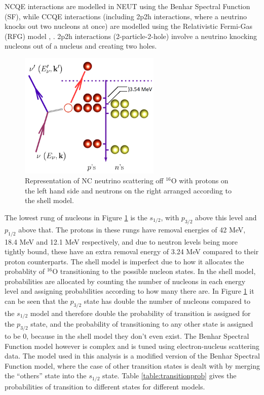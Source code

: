  NCQE interactions are modelled in NEUT using the Benhar Spectral Function (SF), while CCQE interactions (including 2p2h interactions, where a neutrino knocks out two nucleons at once) are modelled using the Relativistic Fermi-Gas (RFG) model \cite{benhar_electron-_2005}, \cite{rfg_model}. 2p2h interactions (2-particle-2-hole) involve a neutrino knocking nucleons out of a nucleus and creating two holes.


\begin{figure}[htp]
    \centering
    \includegraphics[width=0.6\textwidth]{Figures/ncqebenharspectral.png}
    \caption{Representation of NC neutrino scattering off ${ }^{16} \mathrm{O}$ with protons on the left hand side and neutrons on the right arranged according to the shell model.}
\label{fig:ncqebenharspectral}
\end{figure}

The lowest rung of nucleons in Figure \ref{fig:ncqebenharspectral} is the $s_{1/2}$, with $p_{3/2}$ above this level and $p_{1/2}$ above that. The protons in these rungs have removal energies of 42 MeV, 18.4 MeV and 12.1 MeV respectively, and due to neutron levels being more tightly bound, these have an extra removal energy of 3.24 MeV compared to their proton counterparts. The shell model is imperfect due to how it allocates the probablity of ${ }^{16} \mathrm{O}$ transitioning to the possible nucleon states. In the shell model, probabilities are allocated by counting the number of nucleons in each energy level and assigning probabilities according to how many there are. In Figure \ref{fig:ncqebenharspectral} it can be seen that the $p_{3/2}$ state has double the number of nucleons compared to the $s_{1/2}$ model and therefore double the probability of transition is assigned for the $p_{3/2}$ state, and the probability of transitioning to any other state is assigned to be 0, because in the shell model they don't even exist. The Benhar Spectral Function model however is complex and is tuned using electron-nucleus scattering data. The model used in this analysis is a modified version of the Benhar Spectral Function model, where the case of other transition states is dealt with by merging the ``others'' state into the $s_{1/2}$ state. Table \ref{table:transitionprob} gives the probabilities of transition to different states for different models. 

